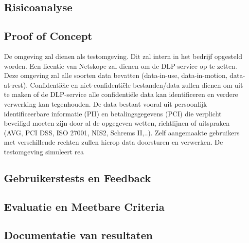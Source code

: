 \subsection{Risicoanalyse}%



\subsection{Proof of Concept}%

De omgeving zal dienen als testomgeving. Dit zal intern in het bedrijf opgesteld worden. Een licentie van Netskope zal dienen om de DLP-service op te zetten. 
Deze omgeving zal alle soorten data bevatten (data-in-use, data-in-motion, data-at-rest). 
Confidentiële en niet-confidentiële bestanden/data zullen dienen om uit te maken of de DLP-service alle confidentiële data kan identificeren en verdere verwerking kan tegenhouden. 
De data bestaat vooral uit persoonlijk identificeerbare informatie (PII) en betalingsgegevens (PCI) die verplicht beveiligd moeten zijn door al de opgegeven wetten, richtlijnen of uitspraken (AVG, PCI DSS, ISO 27001, NIS2, Schrems II,..). 
Zelf aangemaakte gebruikers met verschillende rechten zullen hierop data doorsturen en verwerken. 
De testomgeving simuleert rea

\subsection{Gebruikerstests en Feedback}%

\subsection{Evaluatie en Meetbare Criteria}%

\subsection{Documentatie van resultaten}%





